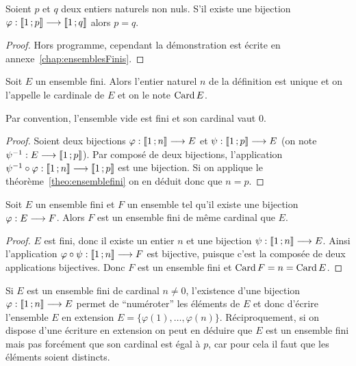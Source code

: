 \begin{theo}
  \label{theo:ensemblefini}
  Soient \(p\) et \(q\) deux entiers naturels non nuls. S'il existe une 
  bijection 
  \(\varphi:\mathopen{\llbracket}1\mathclose{}\mathpunct{};p\mathclose{\rrbracket} \longrightarrow \mathopen{\llbracket}1\mathclose{}\mathpunct{};q\mathclose{\rrbracket}\) 
  alors \(p = q\).
\end{theo}

\begin{proof}
  Hors programme, cependant la démonstration est écrite en 
  annexe~\ref{chap:ensemblesFinis}.
\end{proof}

\begin{prop}[Définition]
  Soit \(E\) un ensemble fini. Alors l'entier naturel \(n\) de la définition 
  est unique et on l'appelle le cardinale de \(E\) et on le note \(\operatorname{Card} 
  E\).
\end{prop}

Par convention, l'ensemble vide est fini et son cardinal vaut \(0\).

\begin{proof}
  Soient deux bijections \(\varphi:\mathopen{\llbracket}1\mathclose{}\mathpunct{};n\mathclose{\rrbracket} \longrightarrow E\) 
  et \(\psi:\mathopen{\llbracket}1\mathclose{}\mathpunct{};p\mathclose{\rrbracket} \longrightarrow E\) (on note 
  \(\psi^{-1}:E \longrightarrow \mathopen{\llbracket}1\mathclose{}\mathpunct{};p\mathclose{\rrbracket}\)). Par composé de 
  deux bijections, l'application \(\psi^{-1}\circ 
  \varphi:\mathopen{\llbracket}1\mathclose{}\mathpunct{};n\mathclose{\rrbracket} \longrightarrow \mathopen{\llbracket}1\mathclose{}\mathpunct{};p\mathclose{\rrbracket}\) est une 
  bijection. Si on applique le théorème~\ref{theo:ensemblefini} on en déduit 
  donc que \(n = p\).
\end{proof}

\begin{prop}
  Soit \(E\) un ensemble fini et \(F\) un ensemble tel qu'il existe une 
  bijection \(\varphi:E \longrightarrow F\). Alors \(F\) est un ensemble fini 
  de même cardinal que \(E\).
\end{prop}

\begin{proof}
  \(E\) est fini, donc il existe un entier \(n\) et une bijection 
  \(\psi:\mathopen{\llbracket}1\mathclose{}\mathpunct{};n\mathclose{\rrbracket} \longrightarrow E\). Ainsi l'application 
  \(\varphi\circ\psi:\mathopen{\llbracket}1\mathclose{}\mathpunct{};n\mathclose{\rrbracket} \longrightarrow F\) est 
  bijective, puisque c'est la composée de deux applications bijectives. Donc 
  \(F\) est un ensemble fini et \(\operatorname{Card} F = n = \operatorname{Card} E\).
\end{proof}

Si \(E\) est un ensemble fini de cardinal \(n\neq 0\), l'existence d'une 
bijection \(\varphi:\mathopen{\llbracket}1\mathclose{}\mathpunct{};n\mathclose{\rrbracket} \longrightarrow E\) permet de 
``numéroter'' les éléments de \(E\) et donc d'écrire l'ensemble \(E\) en 
extension \(E = \{\varphi(1), \ldots, \varphi(n)\}\).
Réciproquement, si on dispose d'une écriture en extension on peut en déduire 
que \(E\) est un ensemble fini mais pas forcément que son cardinal est égal 
à \(p\), car pour cela il faut que les éléments soient distincts.

